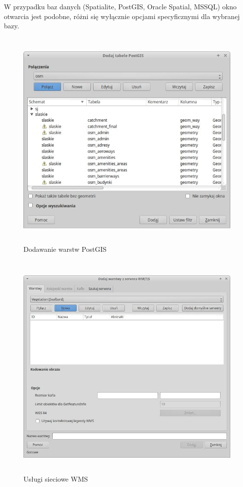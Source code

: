 \documentclass[12pt,a4paper]{book}
\begin{document}
W przypadku baz danych (Spatialite, PostGIS, Oracle Spatial, MSSQL) okno otwarcia jest podobne, różni się wyłącznie opcjami specyficznymi dla wybranej bazy.

\begin{center}
\begin{figure}
\includegraphics[width=13cm,height=11.077cm]{002-dodaj-postgis.png}
\caption{Dodawanie warstw PostGIS}
\end{figure}
\end{center}

\begin{center}
\begin{figure}
\includegraphics[width=13cm,height=11.43cm]{002-dodaj-wms.png}
\caption{Usługi sieciowe WMS}
\end{figure}
\end{center}
\end{document}
